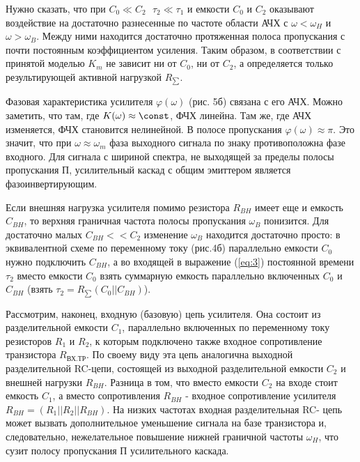 Нужно сказать, что при $C_0\ll C_2~~~\tau_2 \ll \tau_1$ и 
емкости $C_0$ и $C_2$ оказывают воздействие на достаточно 
разнесенные по частоте области АЧХ с $\omega<\omega_H$ и 
$\omega>\omega_B$. Между ними находится достаточно 
протяженная полоса пропускания с почти постоянным 
коэффициентом усиления. Таким образом, в соответствии с принятой моделью $K_m$ не зависит ни от $C_0$, ни от $C_2$, а определяется только результирующей активной нагрузкой $R_{\sum}$. 

Фазовая характеристика усилителя $\varphi(\omega)$ (рис. 5б) связана с его АЧХ. Можно заметить, что там, где $K(\omega) \approx \const$, ФЧХ линейна. Там же, где АЧХ изменяется, ФЧХ становится нелинейной. В полосе пропускания $\varphi(\omega) \approx \pi$. Это значит, что при $\omega \approx \omega_m$ фаза выходного сигнала по знаку противоположна фазе входного. Для сигнала с шириной спектра, не выходящей за пределы полосы пропускания П, усилительный каскад с общим эмиттером является фазоинвертирующим.

Если внешняя нагрузка усилителя помимо резистора $R_{BH}$ имеет еще и емкость $C_{BH}$, то верхняя граничная частота полосы пропускания $\omega_B$ понизится. Для достаточно малых $C_{BH}<<C_2$ изменение $\omega_B$ находится достаточно просто: в эквивалентной схеме по переменному току (рис.4б) параллельно емкости $C_0$ нужно подключить $C_{BH}$, а во входящей в выражение (\ref{eq:3}) постоянной времени $\tau_2$ вместо емкости $C_0$ взять суммарную емкость параллельно включенных $C_0$ и $C_{BH}$ (взять $\tau_2 = R_{\sum}(C_0||C_{BH})$).

Рассмотрим, наконец, входную (базовую) цепь усилителя. Она состоит из разделительной емкости $C_1$, параллельно включенных по переменному току резисторов $R_1$ и $R_2$, к которым подключено также входное сопротивление транзистора $R_{\text{ВХ.ТР}}$. По своему виду эта цепь аналогична выходной разделительной RC-цепи, состоящей из выходной разделительной емкости $C_2$ и внешней нагрузки $R_{BH}$. Разница в том, что вместо емкости $C_2$ на входе стоит емкость $C_1$, а вместо сопротивления $R_{BH}$ - входное сопротивление усилителя $R_{BH}= (R_1||R_2||R_{BH})$. На низких частотах входная разделительная RC- цепь может вызвать дополнительное уменьшение сигнала на базе
транзистора и, следовательно, нежелательное повышение нижней граничной частоты $\omega_H$, что сузит полосу пропускания П усилительного каскада.

